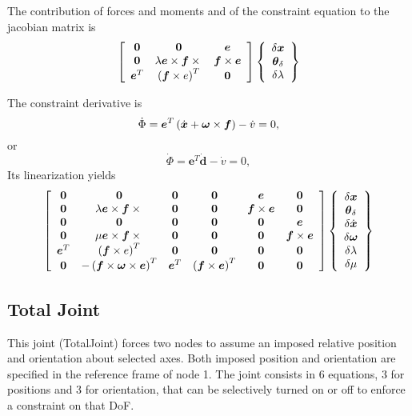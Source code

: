 \documentclass[10pt,dvips,fleqn]{report}
\newcommand{\T}[1]{\boldsymbol{#1}}
\begin{document}
The contribution of forces and moments and of the constraint equation 
to the jacobian matrix is
\begin{equation}
	\sqbr{\matr{ccc}{
		\T{0} & \T{0} & \T{e} \\
		\T{0} & \lambda \T{e}\times\T{f}\times{} & \T{f}\times\T{e} \\
		\T{e}^T & \plbr{\T{f}\times{e}}^T & \T{0}
	}}\cubr{\cvvect{
		\delta\T{x} \\
		\T{\theta}_{\delta} \\
		\delta\lambda
	}}
\end{equation}

The constraint derivative is
\begin{equation}
	\dot{\Phi} = \T{e}^T \plbr{\dot{\T{x}} + \T{\omega}\times\T{f}} - \dot{v} = 0 ,
\end{equation}
or
\begin{equation}
	\dot{\Phi} = \T{e}^T \dot{\T{d}} - \dot{v} = 0 ,
\end{equation}
Its linearization yields
\begin{equation}
	\sqbr{\matr{cccccc}{
		\T{0} & \T{0} & \T{0} & \T{0} & \T{e} & \T{0} \\
		\T{0} & \lambda \T{e}\times\T{f}\times{} & 
			\T{0} & \T{0} & \T{f}\times\T{e} & \T{0} \\
		\T{0} & \T{0} & \T{0} & \T{0} & \T{0} & \T{e} \\
		\T{0} & \mu \T{e}\times\T{f}\times{} & 
			\T{0} & \T{0} & \T{0} & \T{f}\times\T{e} \\
		\T{e}^T & \plbr{\T{f}\times{e}}^T & 
			\T{0} & \T{0} & \T{0} & \T{0} \\
		\T{0} & - \plbr{\T{f}\times\T{\omega}\times\T{e}}^T &
			\T{e}^T & \plbr{\T{f}\times\T{e}}^T & \T{0} & \T{0}
	}}\cubr{\cvvect{
		\delta\T{x} \\
		\T{\theta}_{\delta} \\
		\delta\dot{\T{x}} \\
		\delta\T{\omega} \\
		\delta\lambda \\
		\delta\mu
	}}
\end{equation}













\subsection{Total Joint}
This joint (TotalJoint) forces two nodes to assume an imposed relative
position and orientation about selected axes.
Both imposed position and orientation are specified in the reference frame
of node 1.
The joint consists in 6 equations, 3 for positions and 3 for orientation, 
that can be selectively turned on or off to enforce a constraint on that DoF.
\end{document}
